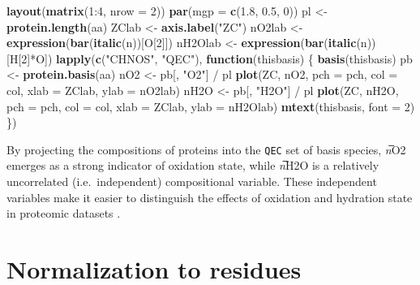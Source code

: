 \documentclass[]{tufte-book}
\newenvironment{Shaded}{}{}
\newcommand{\KeywordTok}[1]{\textcolor[rgb]{0.00,0.44,0.13}{\textbf{#1}}}
\newcommand{\DataTypeTok}[1]{\textcolor[rgb]{0.56,0.13,0.00}{#1}}
\newcommand{\DecValTok}[1]{\textcolor[rgb]{0.25,0.63,0.44}{#1}}
\newcommand{\FloatTok}[1]{\textcolor[rgb]{0.25,0.63,0.44}{#1}}
\newcommand{\StringTok}[1]{\textcolor[rgb]{0.25,0.44,0.63}{#1}}
\newcommand{\ControlFlowTok}[1]{\textcolor[rgb]{0.00,0.44,0.13}{\textbf{#1}}}
\newcommand{\OperatorTok}[1]{\textcolor[rgb]{0.40,0.40,0.40}{#1}}
\newcommand{\NormalTok}[1]{#1}
\begin{document}
\begin{Shaded}
\begin{Highlighting}[]
\KeywordTok{layout}\NormalTok{(}\KeywordTok{matrix}\NormalTok{(}\DecValTok{1}\OperatorTok{:}\DecValTok{4}\NormalTok{, }\DataTypeTok{nrow =} \DecValTok{2}\NormalTok{))}
\KeywordTok{par}\NormalTok{(}\DataTypeTok{mgp =} \KeywordTok{c}\NormalTok{(}\FloatTok{1.8}\NormalTok{, }\FloatTok{0.5}\NormalTok{, }\DecValTok{0}\NormalTok{))}
\NormalTok{pl <-}\StringTok{ }\KeywordTok{protein.length}\NormalTok{(aa)}
\NormalTok{ZClab <-}\StringTok{ }\KeywordTok{axis.label}\NormalTok{(}\StringTok{"ZC"}\NormalTok{)}
\NormalTok{nO2lab <-}\StringTok{ }\KeywordTok{expression}\NormalTok{(}\KeywordTok{bar}\NormalTok{(}\KeywordTok{italic}\NormalTok{(n))[O[}\DecValTok{2}\NormalTok{]])}
\NormalTok{nH2Olab <-}\StringTok{ }\KeywordTok{expression}\NormalTok{(}\KeywordTok{bar}\NormalTok{(}\KeywordTok{italic}\NormalTok{(n))[H[}\DecValTok{2}\NormalTok{]}\OperatorTok{*}\NormalTok{O])}
\KeywordTok{lapply}\NormalTok{(}\KeywordTok{c}\NormalTok{(}\StringTok{"CHNOS"}\NormalTok{, }\StringTok{"QEC"}\NormalTok{), }\ControlFlowTok{function}\NormalTok{(thisbasis) \{}
  \KeywordTok{basis}\NormalTok{(thisbasis)}
\NormalTok{  pb <-}\StringTok{ }\KeywordTok{protein.basis}\NormalTok{(aa)}
\NormalTok{  nO2 <-}\StringTok{ }\NormalTok{pb[, }\StringTok{"O2"}\NormalTok{] }\OperatorTok{/}\StringTok{ }\NormalTok{pl}
  \KeywordTok{plot}\NormalTok{(ZC, nO2, }\DataTypeTok{pch =}\NormalTok{ pch, }\DataTypeTok{col =}\NormalTok{ col, }\DataTypeTok{xlab =}\NormalTok{ ZClab, }\DataTypeTok{ylab =}\NormalTok{ nO2lab)}
\NormalTok{  nH2O <-}\StringTok{ }\NormalTok{pb[, }\StringTok{"H2O"}\NormalTok{] }\OperatorTok{/}\StringTok{ }\NormalTok{pl}
  \KeywordTok{plot}\NormalTok{(ZC, nH2O, }\DataTypeTok{pch =}\NormalTok{ pch, }\DataTypeTok{col =}\NormalTok{ col, }\DataTypeTok{xlab =}\NormalTok{ ZClab, }\DataTypeTok{ylab =}\NormalTok{ nH2Olab)}
  \KeywordTok{mtext}\NormalTok{(thisbasis, }\DataTypeTok{font =} \DecValTok{2}\NormalTok{)}
\NormalTok{\})}
\end{Highlighting}
\end{Shaded}

By projecting the compositions of proteins into the \texttt{QEC} set of
basis species, \emph{n}̅O2 emerges as a strong indicator of oxidation
state, while \emph{n}̅H2O is a relatively uncorrelated (i.e.~independent)
compositional variable. These independent variables make it easier to
distinguish the effects of oxidation and hydration state in proteomic
datasets \citep{Dic17}.

\section{Normalization to residues}\label{normalization-to-residues}
\end{document}
